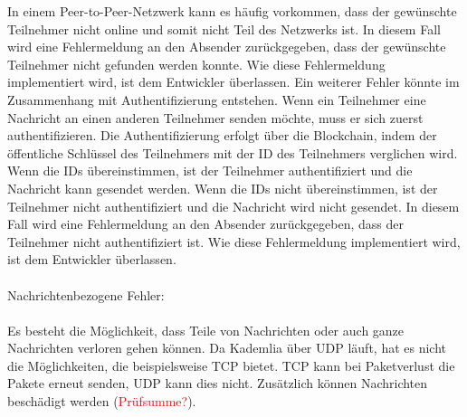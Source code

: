 In einem Peer-to-Peer-Netzwerk kann es häufig vorkommen, dass der gewünschte Teilnehmer nicht online und somit nicht Teil des Netzwerks ist. In diesem Fall wird eine Fehlermeldung an den Absender zurückgegeben, dass der gewünschte Teilnehmer nicht gefunden werden konnte. Wie diese Fehlermeldung implementiert wird, ist dem Entwickler überlassen. Ein weiterer Fehler könnte im Zusammenhang mit Authentifizierung entstehen. Wenn ein Teilnehmer eine Nachricht an einen anderen Teilnehmer senden möchte, muss er sich zuerst authentifizieren. Die Authentifizierung erfolgt über die Blockchain, indem der öffentliche Schlüssel des Teilnehmers mit der ID des Teilnehmers verglichen wird. Wenn die IDs übereinstimmen, ist der Teilnehmer authentifiziert und die Nachricht kann gesendet werden. Wenn die IDs nicht übereinstimmen, ist der Teilnehmer nicht authentifiziert und die Nachricht wird nicht gesendet. In diesem Fall wird eine Fehlermeldung an den Absender zurückgegeben, dass der Teilnehmer nicht authentifiziert ist. Wie diese Fehlermeldung implementiert wird, ist dem Entwickler überlassen.
\\
\\
Nachrichtenbezogene Fehler:
\\
\\
Es besteht die Möglichkeit, dass Teile von Nachrichten oder auch ganze Nachrichten verloren gehen können. Da Kademlia über UDP läuft, hat es nicht die Möglichkeiten, die beispielsweise TCP bietet. TCP kann bei Paketverlust die Pakete erneut senden, UDP kann dies nicht. Zusätzlich können Nachrichten beschädigt werden (\textcolor{red}{Prüfsumme?}).
